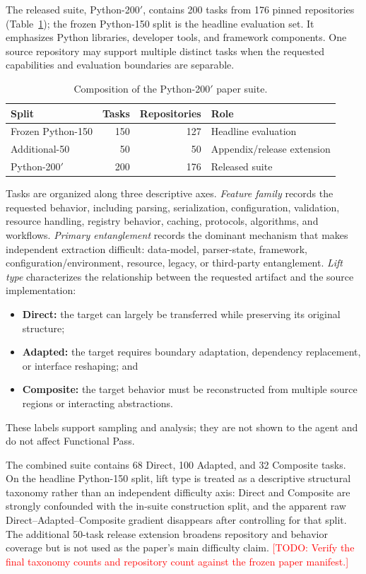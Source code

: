 \documentclass[acmsmall,screen,review,anonymous]{acmart}
\newcommand{\draftnote}[1]{\textcolor{red}{[TODO: #1]}}
\begin{document}
The released suite, Python-200$'$, contains 200 tasks from 176 pinned
repositories (Table~\ref{tab:suite}); the frozen Python-150 split is the headline
evaluation set. It emphasizes Python libraries, developer
tools, and framework components. One source repository may support multiple
distinct tasks when the requested capabilities and evaluation boundaries are
separable.

\begin{table}[t]
  \caption{Composition of the Python-200$'$ paper suite.}
  \label{tab:suite}
  \centering
  \begin{tabular}{lrrl}
    \toprule
    \textbf{Split} & \textbf{Tasks} & \textbf{Repositories} & \textbf{Role} \\
    \midrule
    Frozen Python-150 & 150 & 127 & Headline evaluation \\
    Additional-50 & 50 & 50 & Appendix/release extension \\
    \midrule
    Python-200$'$ & 200 & 176 & Released suite \\
    \bottomrule
  \end{tabular}
\end{table}

Tasks are organized along three descriptive axes. \emph{Feature family} records
the requested behavior, including parsing, serialization, configuration,
validation, resource handling, registry behavior, caching, protocols, algorithms,
and workflows. \emph{Primary entanglement} records the dominant mechanism that
makes independent extraction difficult: data-model, parser-state, framework,
configuration/environment, resource, legacy, or third-party entanglement.
\emph{Lift type} characterizes the relationship between the requested artifact
and the source implementation:
\begin{itemize}
  \item \textbf{Direct:} the target can largely be transferred while preserving
        its original structure;
  \item \textbf{Adapted:} the target requires boundary adaptation, dependency
        replacement, or interface reshaping; and
  \item \textbf{Composite:} the target behavior must be reconstructed from
        multiple source regions or interacting abstractions.
\end{itemize}
These labels support sampling and analysis; they are not shown to the agent and do
not affect Functional Pass.

The combined suite contains 68 Direct, 100 Adapted, and 32 Composite tasks. On
the headline Python-150 split, lift type is treated as a descriptive structural
taxonomy rather than an independent difficulty axis: Direct and Composite are
strongly confounded with the in-suite construction split, and the apparent raw
Direct--Adapted--Composite gradient disappears after controlling for that split.
The additional 50-task release extension broadens repository and behavior
coverage but is not used as the paper's main difficulty claim. \draftnote{Verify the final taxonomy
counts and repository count against the frozen paper manifest.}
\end{document}
